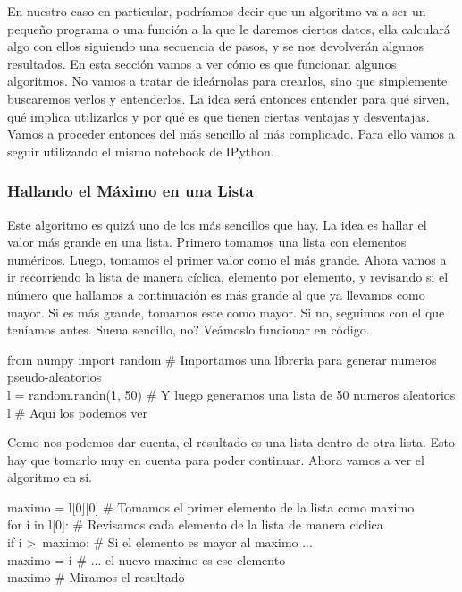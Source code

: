 \documentclass[10pt,letterpaper]{article}
\newenvironment{Code}
{
\begin{lrbox}{\selvestebox}%
\begin{minipage}{\dimexpr\columnwidth-2\fboxsep\relax}
\fontfamily{\ttdefault}\selectfont
}
{\end{minipage}\end{lrbox}%
\begin{center}
\colorbox{light-gray}{\usebox{\selvestebox}}
\end{center}
}
\begin{document}
En nuestro caso en particular, podr\'iamos decir que un algoritmo va a ser un peque\~no programa o una funci\'on a la que le daremos ciertos datos, ella calcular\'a algo con ellos siguiendo una secuencia de pasos, y se nos devolver\'an algunos resultados. En esta secci\'on vamos a ver c\'omo es que funcionan algunos algoritmos. No vamos a tratar de ide\'arnolas para crearlos, sino que simplemente buscaremos verlos y entenderlos. La idea ser\'a entonces entender para qu\'e sirven, qu\'e implica utilizarlos y por qu\'e es que tienen ciertas ventajas y desventajas. Vamos a proceder entonces del m\'as sencillo al m\'as complicado. Para ello vamos a seguir utilizando el mismo notebook de IPython.

\subsubsection{Hallando el M\'aximo en una Lista}
Este algoritmo es quiz\'a uno de los m\'as sencillos que hay. La idea es hallar el valor m\'as grande en una lista. Primero tomamos una lista con elementos num\'ericos. Luego, tomamos el primer valor como el m\'as grande. Ahora vamos a ir recorriendo la lista de manera c\'iclica, elemento por elemento, y revisando si el n\'umero que hallamos a continuaci\'on es m\'as grande al que ya llevamos como mayor. Si es m\'as grande, tomamos este como mayor. Si no, seguimos con el que ten\'iamos antes. Suena sencillo, no? Ve\'amoslo funcionar en c\'odigo.

\begin{small}
\begin{Code}
from numpy import random \# Importamos una libreria para generar numeros pseudo-aleatorios\\
l = random.randn(1, 50) \# Y luego generamos una lista de 50 numeros aleatorios\\
l \# Aqui los podemos ver
\end{Code}
\end{small}

Como nos podemos dar cuenta, el resultado es una lista dentro de otra lista. Esto hay que tomarlo muy en cuenta para poder continuar. Ahora vamos a ver el algoritmo en s\'i.

\begin{small}
\begin{Code}
maximo = l[0][0] \# Tomamos el primer elemento de la lista como maximo\\
for i in l[0]: \# Revisamos cada elemento de la lista de manera ciclica\\
\hspace*{4mm} if i >\ maximo: \# Si el elemento es mayor al maximo ...\\
\hspace*{12mm} maximo = i \# ... el nuevo maximo es ese elemento\\
maximo \# Miramos el resultado
\end{Code}
\end{small}
\end{document}
